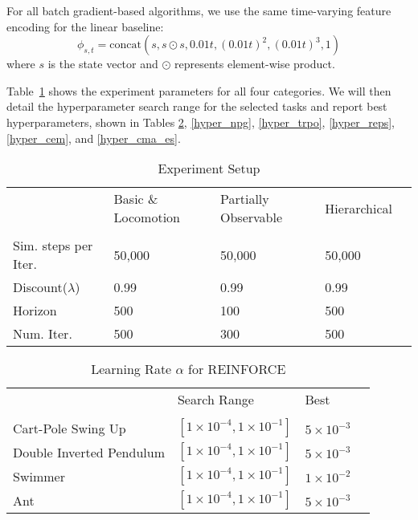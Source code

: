 \documentclass{article}
\begin{document}
For all batch gradient-based algorithms, we use the same time-varying feature encoding for the linear baseline:
\[ \phi_{s,t} = \mathrm{concat}(s, s \odot s, 0.01t, (0.01t)^2, (0.01t)^3, 1) \]
where $s$ is the state vector and $\odot$ represents element-wise product.

Table~\ref{experiment_setup} shows the experiment parameters for all four categories. We will then detail the hyperparameter search range for the selected tasks and report best hyperparameters, shown in Tables \ref{hyper_vpg}, \ref{hyper_npg}, \ref{hyper_trpo}, \ref{hyper_reps}, \ref{hyper_cem}, and \ref{hyper_cma_es}.

\begin{table}[!h]
\centering
\caption{Experiment Setup}
\label{experiment_setup}
\begin{tabular}{l|llll}
\cline{1-4} \\ [-8pt]
                     & Basic \& Locomotion       & Partially Observable & Hierarchical &  \\ [2pt] \cline{1-4} \\ [-8pt]
Sim. steps per Iter. & 50,000                    & 50,000               & 50,000       &  \\
Discount($\lambda$)  & 0.99                      & 0.99                 & 0.99         &  \\
Horizon              & 500                       & 100                  & 500          &  \\
Num. Iter.           & 500  & 300                  & 500        & \\ [2pt] \cline{1-4}
\end{tabular}
\end{table}


\begin{table}[!h]
\centering
\caption{Learning Rate $\alpha$ for REINFORCE}
\label{hyper_vpg}
\begin{tabular}{l|lll}
\cline{1-4} \\ [-8pt]
& Search Range              & Best                 &  \\ [2pt] \cline{1-4} \\ [-8pt]
Cart-Pole Swing Up     & $[1\times 10^{-4}, 1\times 10^{-1}]$            & $5\times 10^{-3}$               &  \\
Double Inverted Pendulum     & $[1\times 10^{-4}, 1\times 10^{-1}]$     & $5\times 10^{-3}$               &  \\
Swimmer               & $[1\times 10^{-4}, 1\times 10^{-1}]$            & $1\times 10^{-2}$               &  \\
Ant                   & $[1\times 10^{-4}, 1\times 10^{-1}]$            & $5\times 10^{-3}$               & \\ [2pt] \cline{1-4}
\end{tabular}
\end{table}
\end{document}
